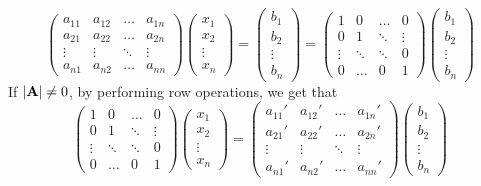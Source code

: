 \documentclass{huhtakm-template-book}
\begin{document}
\begin{equation*}
    \begin{pmatrix}
        a_{11} & a_{12} & \hdots & a_{1n}\\
        a_{21} & a_{22} & \hdots & a_{2n}\\
        \vdots & \vdots & \ddots & \vdots\\
        a_{n1} & a_{n2} & \hdots & a_{nn}
    \end{pmatrix}\begin{pmatrix}
        x_{1}\\
        x_{2}\\
        \vdots\\
        x_{n}
    \end{pmatrix}=\begin{pmatrix}
        b_{1}\\
        b_{2}\\
        \vdots\\
        b_{n}
    \end{pmatrix}=\begin{pmatrix}
        1 & 0 & \hdots & 0\\
        0 & 1 & \ddots & \vdots\\
        \vdots & \ddots & \ddots & 0\\
        0 & \hdots & 0 & 1
    \end{pmatrix}\begin{pmatrix}
        b_{1}\\
        b_{2}\\
        \vdots\\
        b_{n}
    \end{pmatrix}
\end{equation*}
If $\left|{\mathbf{A}}\right|\neq 0$, by performing row operations, we get that
\begin{equation*}
    \begin{pmatrix}
        1 & 0 & \hdots & 0\\
        0 & 1 & \ddots & \vdots\\
        \vdots & \ddots & \ddots & 0\\
        0 & \hdots & 0 & 1
    \end{pmatrix}\begin{pmatrix}
        x_{1}\\
        x_{2}\\
        \vdots\\
        x_{n}
    \end{pmatrix}=\begin{pmatrix}
        a_{11}' & a_{12}' & \hdots & a_{1n}'\\
        a_{21}' & a_{22}' & \hdots & a_{2n}'\\
        \vdots & \vdots & \ddots & \vdots\\
        a_{n1}' & a_{n2}' & \hdots & a_{nn}'
    \end{pmatrix}\begin{pmatrix}
        b_{1}\\
        b_{2}\\
        \vdots\\
        b_{n}
    \end{pmatrix}
\end{equation*}
\end{document}
